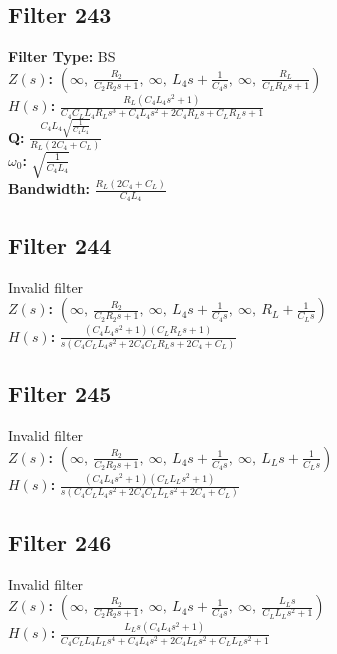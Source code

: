 \documentclass{article}
\begin{document}
\subsection*{Filter 243}
\textbf{Filter Type:} BS \\ 
\textbf{$Z(s)$:} $\left( \infty, \  \frac{R_{2}}{C_{2} R_{2} s + 1}, \  \infty, \  L_{4} s + \frac{1}{C_{4} s}, \  \infty, \  \frac{R_{L}}{C_{L} R_{L} s + 1}\right)$ \\ 
\textbf{$H(s)$:} $\frac{R_{L} \left(C_{4} L_{4} s^{2} + 1\right)}{C_{4} C_{L} L_{4} R_{L} s^{3} + C_{4} L_{4} s^{2} + 2 C_{4} R_{L} s + C_{L} R_{L} s + 1}$ \\ 
\textbf{Q:} $\frac{C_{4} L_{4} \sqrt{\frac{1}{C_{4} L_{4}}}}{R_{L} \left(2 C_{4} + C_{L}\right)}$ \\ 
\textbf{$\omega_0$:} $\sqrt{\frac{1}{C_{4} L_{4}}}$ \\ 
\textbf{Bandwidth:} $\frac{R_{L} \left(2 C_{4} + C_{L}\right)}{C_{4} L_{4}}$ \\ 
\subsection*{Filter 244}
Invalid filter \\ 
\textbf{$Z(s)$:} $\left( \infty, \  \frac{R_{2}}{C_{2} R_{2} s + 1}, \  \infty, \  L_{4} s + \frac{1}{C_{4} s}, \  \infty, \  R_{L} + \frac{1}{C_{L} s}\right)$ \\ 
\textbf{$H(s)$:} $\frac{\left(C_{4} L_{4} s^{2} + 1\right) \left(C_{L} R_{L} s + 1\right)}{s \left(C_{4} C_{L} L_{4} s^{2} + 2 C_{4} C_{L} R_{L} s + 2 C_{4} + C_{L}\right)}$ \\ 
\subsection*{Filter 245}
Invalid filter \\ 
\textbf{$Z(s)$:} $\left( \infty, \  \frac{R_{2}}{C_{2} R_{2} s + 1}, \  \infty, \  L_{4} s + \frac{1}{C_{4} s}, \  \infty, \  L_{L} s + \frac{1}{C_{L} s}\right)$ \\ 
\textbf{$H(s)$:} $\frac{\left(C_{4} L_{4} s^{2} + 1\right) \left(C_{L} L_{L} s^{2} + 1\right)}{s \left(C_{4} C_{L} L_{4} s^{2} + 2 C_{4} C_{L} L_{L} s^{2} + 2 C_{4} + C_{L}\right)}$ \\ 
\subsection*{Filter 246}
Invalid filter \\ 
\textbf{$Z(s)$:} $\left( \infty, \  \frac{R_{2}}{C_{2} R_{2} s + 1}, \  \infty, \  L_{4} s + \frac{1}{C_{4} s}, \  \infty, \  \frac{L_{L} s}{C_{L} L_{L} s^{2} + 1}\right)$ \\ 
\textbf{$H(s)$:} $\frac{L_{L} s \left(C_{4} L_{4} s^{2} + 1\right)}{C_{4} C_{L} L_{4} L_{L} s^{4} + C_{4} L_{4} s^{2} + 2 C_{4} L_{L} s^{2} + C_{L} L_{L} s^{2} + 1}$ \\ 
\end{document}
